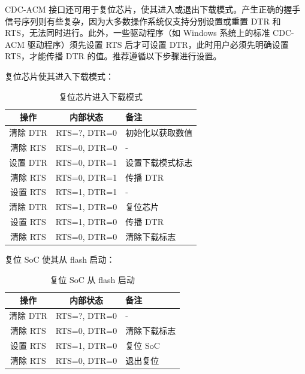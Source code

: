 \documentclass[main\_\_CN.tex]{subfiles}
\begin{document}
CDC-ACM 接口还可用于复位芯片，使其进入或退出下载模式。产生正确的握手信号序列则有些复杂，因为大多数操作系统仅支持分别设置或重置 DTR 和 RTS，无法同时进行。此外，一些驱动程序（如 Windows 系统上的标准 CDC-ACM 驱动程序）须先设置 RTS 后才可设置 DTR，此时用户必须先明确设置 RTS，才能传播 DTR 的值。推荐遵循以下步骤进行设置。

复位芯片使其进入下载模式：

\begin{table}[H]
    \centering
    \caption{复位芯片进入下载模式}
    \label{tab:usbserialjtag-reset-soc-into-download-mode}
    \begin{tabular} {|c|c|l|}
    \hline
        \rowcolor{lightgray}
        \textbf{操作} & \textbf{内部状态} & \textbf{备注} \\\hline
        
        清除 DTR & RTS=?, DTR=0 & 初始化以获取数值 \\\hline
        清除 RTS & RTS=0, DTR=0 & - \\\hline
        设置 DTR & RTS=0, DTR=1 & 设置下载模式标志 \\\hline
        清除 RTS & RTS=0, DTR=1 & 传播 DTR \\\hline
        设置 RTS & RTS=1, DTR=1 & - \\\hline
        清除 DTR & RTS=1, DTR=0 & 复位芯片 \\\hline
        设置 RTS & RTS=1, DTR=0 & 传播 DTR \\\hline
        清除 RTS & RTS=0, DTR=0 & 清除下载标志\\\hline
    \end{tabular}
\end{table}

\clearpage
复位 SoC 使其从 flash 启动：

\begin{table}[H]
    \centering
    \caption{复位 SoC 从 flash 启动}
    \label{tab:usbserialjtag-reset-soc-into-booting}
    \begin{tabular} {|c|c|l|}
    \hline
        \rowcolor{lightgray}
        \textbf{操作} & \textbf{内部状态} & \textbf{备注} \\\hline
        
        清除 DTR & RTS=?, DTR=0 & - \\\hline
        清除 RTS & RTS=0, DTR=0 &  清除下载标志 \\\hline
        设置 RTS & RTS=1, DTR=0 &  复位 SoC \\\hline
        清除 RTS & RTS=0, DTR=0 & 退出复位 \\\hline
    \end{tabular}
\end{table}
\end{document}

